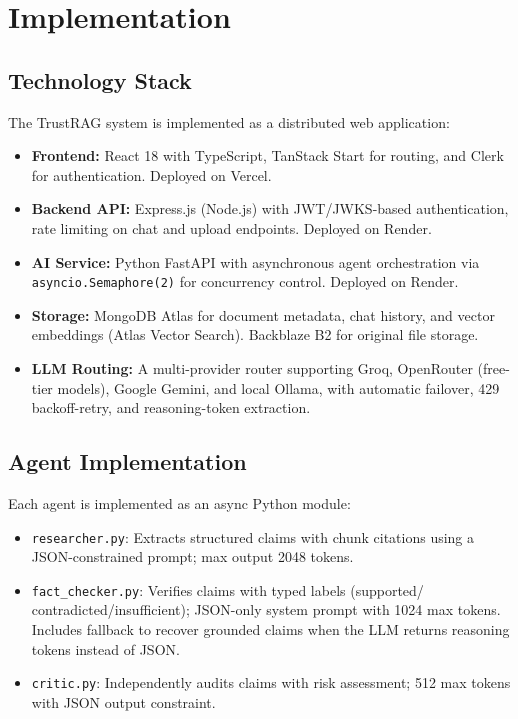 \documentclass[conference]{IEEEtran}
\begin{document}
\section{Implementation}
\label{sec:implementation}

\subsection{Technology Stack}
The TrustRAG system is implemented as a distributed web application:
\begin{itemize}
  \item \textbf{Frontend:} React 18 with TypeScript, TanStack Start for routing,
    and Clerk for authentication. Deployed on Vercel.
  \item \textbf{Backend API:} Express.js (Node.js) with JWT/JWKS-based
    authentication, rate limiting on chat and upload endpoints. Deployed on Render.
  \item \textbf{AI Service:} Python FastAPI with asynchronous agent orchestration
    via \texttt{asyncio.Semaphore(2)} for concurrency control. Deployed on Render.
  \item \textbf{Storage:} MongoDB Atlas for document metadata, chat history, and
    vector embeddings (Atlas Vector Search). Backblaze B2 for original file storage.
  \item \textbf{LLM Routing:} A multi-provider router supporting Groq, OpenRouter
    (free-tier models), Google Gemini, and local Ollama, with automatic failover,
    429 backoff-retry, and reasoning-token extraction.
\end{itemize}

\subsection{Agent Implementation}
Each agent is implemented as an async Python module:
\begin{itemize}
  \item \texttt{researcher.py}: Extracts structured claims with chunk citations
    using a JSON-constrained prompt; max output 2048 tokens.
  \item \texttt{fact\_checker.py}: Verifies claims with typed labels (supported/
    contradicted/insufficient); JSON-only system prompt with 1024 max tokens.
    Includes fallback to recover grounded claims when the LLM returns reasoning
    tokens instead of JSON.
  \item \texttt{critic.py}: Independently audits claims with risk assessment;
    512 max tokens with JSON output constraint.
\end{itemize}
\end{document}
